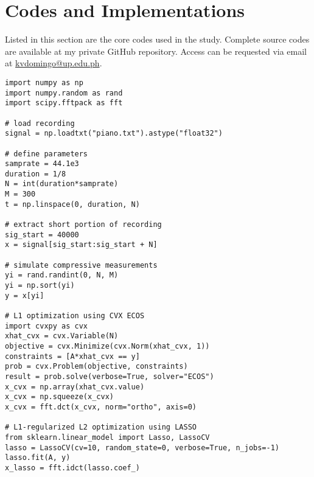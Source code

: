 \chapter{Codes and Implementations}
\label{appendix:codes}

Listed in this section are the core codes used in the study. Complete source codes are available at my private GitHub repository. Access can be requested via email at \url{kvdomingo@up.edu.ph}.

\singlespacing
{}


\begin{lstlisting}
import numpy as np
import numpy.random as rand
import scipy.fftpack as fft

# load recording
signal = np.loadtxt("piano.txt").astype("float32")

# define parameters
samprate = 44.1e3
duration = 1/8
N = int(duration*samprate)
M = 300
t = np.linspace(0, duration, N)

# extract short portion of recording
sig_start = 40000
x = signal[sig_start:sig_start + N]

# simulate compressive measurements
yi = rand.randint(0, N, M)
yi = np.sort(yi)
y = x[yi]

# L1 optimization using CVX ECOS
import cvxpy as cvx
xhat_cvx = cvx.Variable(N)
objective = cvx.Minimize(cvx.Norm(xhat_cvx, 1))
constraints = [A*xhat_cvx == y]
prob = cvx.Problem(objective, constraints)
result = prob.solve(verbose=True, solver="ECOS")
x_cvx = np.array(xhat_cvx.value)
x_cvx = np.squeeze(x_cvx)
x_cvx = fft.dct(x_cvx, norm="ortho", axis=0)

# L1-regularized L2 optimization using LASSO
from sklearn.linear_model import Lasso, LassoCV
lasso = LassoCV(cv=10, random_state=0, verbose=True, n_jobs=-1)
lasso.fit(A, y)
x_lasso = fft.idct(lasso.coef_)
\end{lstlisting}


